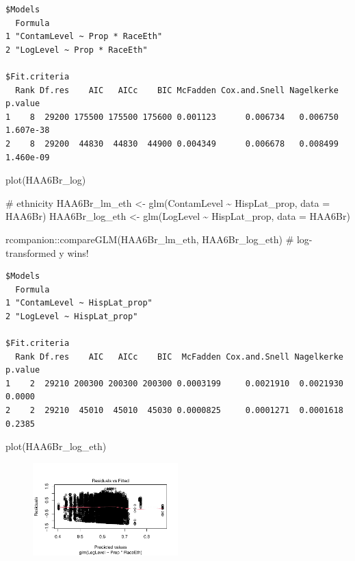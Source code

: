 \documentclass[
  letterpaper,
  DIV=11,
  numbers=noendperiod]{scrartcl}
\newenvironment{Shaded}{\begin{snugshade}}{\end{snugshade}}
\newcommand{\AttributeTok}[1]{\textcolor[rgb]{0.40,0.45,0.13}{#1}}
\newcommand{\CommentTok}[1]{\textcolor[rgb]{0.37,0.37,0.37}{#1}}
\newcommand{\FunctionTok}[1]{\textcolor[rgb]{0.28,0.35,0.67}{#1}}
\newcommand{\NormalTok}[1]{\textcolor[rgb]{0.00,0.23,0.31}{#1}}
\newcommand{\OtherTok}[1]{\textcolor[rgb]{0.00,0.23,0.31}{#1}}
\newcommand{\SpecialCharTok}[1]{\textcolor[rgb]{0.37,0.37,0.37}{#1}}
\begin{document}
\begin{verbatim}
$Models
  Formula                       
1 "ContamLevel ~ Prop * RaceEth"
2 "LogLevel ~ Prop * RaceEth"   

$Fit.criteria
  Rank Df.res    AIC   AICc    BIC McFadden Cox.and.Snell Nagelkerke   p.value
1    8  29200 175500 175500 175600 0.001123      0.006734   0.006750 1.607e-38
2    8  29200  44830  44830  44900 0.004349      0.006678   0.008499 1.460e-09
\end{verbatim}

\begin{Shaded}
\begin{Highlighting}[]
\FunctionTok{plot}\NormalTok{(HAA6Br\_log)}

\CommentTok{\# ethnicity}
\NormalTok{HAA6Br\_lm\_eth }\OtherTok{\textless{}{-}} \FunctionTok{glm}\NormalTok{(ContamLevel }\SpecialCharTok{\textasciitilde{}}\NormalTok{ HispLat\_prop, }\AttributeTok{data =}\NormalTok{ HAA6Br)}
\NormalTok{HAA6Br\_log\_eth }\OtherTok{\textless{}{-}} \FunctionTok{glm}\NormalTok{(LogLevel }\SpecialCharTok{\textasciitilde{}}\NormalTok{ HispLat\_prop, }\AttributeTok{data =}\NormalTok{ HAA6Br)}

\NormalTok{rcompanion}\SpecialCharTok{::}\FunctionTok{compareGLM}\NormalTok{(HAA6Br\_lm\_eth, HAA6Br\_log\_eth) }\CommentTok{\# log{-}transformed y wins!}
\end{Highlighting}
\end{Shaded}

\begin{verbatim}
$Models
  Formula                     
1 "ContamLevel ~ HispLat_prop"
2 "LogLevel ~ HispLat_prop"   

$Fit.criteria
  Rank Df.res    AIC   AICc    BIC  McFadden Cox.and.Snell Nagelkerke p.value
1    2  29210 200300 200300 200300 0.0003199     0.0021910  0.0021930  0.0000
2    2  29210  45010  45010  45030 0.0000825     0.0001271  0.0001618  0.2385
\end{verbatim}

\begin{Shaded}
\begin{Highlighting}[]
\FunctionTok{plot}\NormalTok{(HAA6Br\_log\_eth)}
\end{Highlighting}
\end{Shaded}

\begin{figure}[H]

{\centering \includegraphics[width=0.5\textwidth,height=\textheight]{appendix_files/figure-pdf/unnamed-chunk-5-1.pdf}

}

\end{figure}
\end{document}
